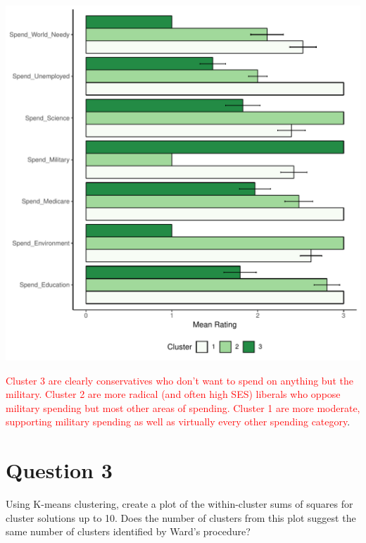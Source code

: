 \documentclass{article}\usepackage[]{graphicx}\usepackage[]{color}
\makeatletter
\def\maxwidth{ %
  \ifdim\Gin@nat@width>\linewidth
    \linewidth
  \else
    \Gin@nat@width
  \fi
}
\newenvironment{knitrout}{}{} %
\makeatother
\begin{document}
\begin{knitrout}
\includegraphics[width=\maxwidth]{figure/unnamed-chunk-6-1} 

\end{knitrout}

\textcolor{red}{Cluster 3 are clearly conservatives who don't want to spend on anything but the military. Cluster 2 are more radical (and often high SES) liberals who oppose military spending but most other areas of spending. Cluster 1 are more moderate, supporting military spending as well as virtually every other spending category}.

\section{Question 3}
Using K-means clustering, create a plot of the within-cluster sums of squares for cluster solutions up to 10. Does the number of clusters from this plot suggest the same number of clusters identified by Ward’s procedure?
\end{document}
